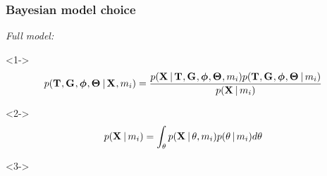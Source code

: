 \begin{frame}[t]
    \frametitle{Bayesian model choice}
    \begin{block}{\it Full model:}
        \begin{minipage}[c][3.8cm][c]{\linewidth}
            \begin{uncoverenv}<1->
            \[
                p(
                  \divTimeMapVector,
                  \geneTreeVector,
                  \hkyModelVector,
                  \demographicParamVector
                  \given \alignmentVector, \divModel{i})
                  =
                \frac{
                    p(\alignmentVector \given
                      \divTimeMapVector,
                      \geneTreeVector,
                      \hkyModelVector,
                      \demographicParamVector,
                      \divModel{i}
                      )
                      p(
                        \divTimeMapVector,
                        \geneTreeVector,
                        \hkyModelVector,
                        \demographicParamVector
                        \given \divModel{i}
                        )
                    }{p(\alignmentVector \given \divModel{i})}
            \]\vspace{-1mm}
            \end{uncoverenv}
            \begin{uncoverenv}<2->
            \[
                p(\alignmentVector \given \divModel{i}) =
                \int_{\allParameters}
                p(\alignmentVector \given \allParameters, \divModel{i})
                p(\allParameters \given \divModel{i})
                d\allParameters
            \]\vspace{-1mm}
            \end{uncoverenv}
            \begin{uncoverenv}<3->

\end{uncoverenv}
\end{minipage}
\end{block}
\end{frame}
